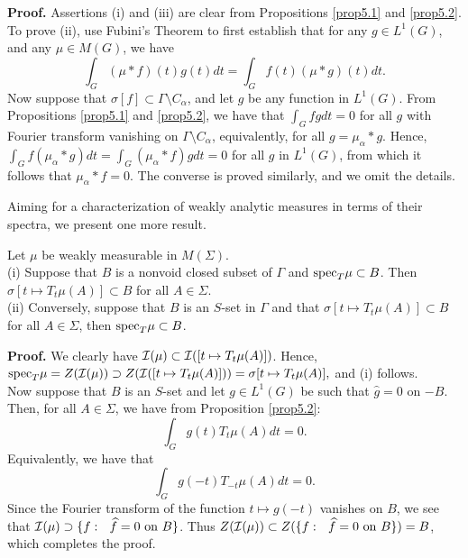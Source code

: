 \documentclass[12pt,leqno]{article}
\def\cI{{\cal I}}
\begin{document}
{\bf Proof.}  Assertions (i) and (iii) are clear from
Propositions \ref{prop5.1} and \ref{prop5.2}.  
To prove 
(ii), use Fubini's Theorem to first establish
that for any $g\in L^1(G)$, and any $\mu\in M(G)$, we have
$$\int_G (\mu*f)(t) g(t)dt=\int_G f(t)(\mu*g)(t)dt.$$
Now suppose that 
$\sigma[f] \subset \Gamma\setminus C_\alpha$, and let $g$ be any function in
$L^1(G)$.  From Propositions \ref{prop5.1} and 
\ref{prop5.2}, we have that
$\int_G f g dt = 0$ for all $g$ with Fourier transform vanishing on
$\Gamma\setminus C_\alpha$, equivalently, for all $g=\mu_\alpha*g$.
Hence, $\int_G f (\mu_\alpha*g) dt = \int_G (\mu_\alpha*f) g dt=0$ for all $g$
 in $L^1(G)$, from which it follows that $\mu_\alpha * f=0$.  
 The converse is proved similarly, and we omit the details.

Aiming for a characterization of weakly analytic measures in terms of their spectra, we present one more result.
\begin{prop}
Let $\mu$ be weakly measurable in $M(\Sigma)$.\\
(i)  Suppose that $B$ is a nonvoid closed
subset of $\Gamma$ and ${\rm spec}_T\mu\subset B$.   
Then $\sigma[t\mapsto T_t\mu(A)]\subset B$ for all 
$A\in\Sigma$.\\
(ii)  Conversely, suppose that $B$ is an $S$-set in $\Gamma$
and that $\sigma[t\mapsto T_t\mu(A)] \subset B$ for all
$A\in\Sigma$, then ${\rm spec}_T\mu \subset B$.
\label{prop5.5}
\end{prop}
{\bf Proof.}  We clearly have 
$\cI (\mu)\subset \cI ([t\mapsto T_t\mu(A)])$. 
Hence, ${\rm spec}_T \mu=Z(\cI (\mu))\supset 
Z(\cI([t\mapsto T_t\mu(A)]))=\sigma[t\mapsto T_t\mu(A)],$
and (i) follows.  \\
Now suppose that $B$ is an $S$-set and let $g\in L^1(G)$ 
be such that $\widehat{g}= 0$ on $-B$.  Then, for all
$A\in\Sigma$,
we have from Proposition \ref{prop5.2}:
$$\int_G g (t) T_t\mu (A)d t = 0.$$ 
Equivalently, we
have that
$$\int_G g(-t) T_{-t}\mu(A) dt =0.$$
Since the Fourier transform of the function
$t\mapsto g(-t)$ vanishes on $B$,
we see that
$\cI (\mu) \supset \{f:\ \ \widehat{f}=0\ {\rm on}\ B\}$.
Thus $Z(\cI (\mu))\subset 
Z(\{f:\ \ \widehat{f}=0\ {\rm on} \ B\})=B$,
which completes the proof.
\end{document}
